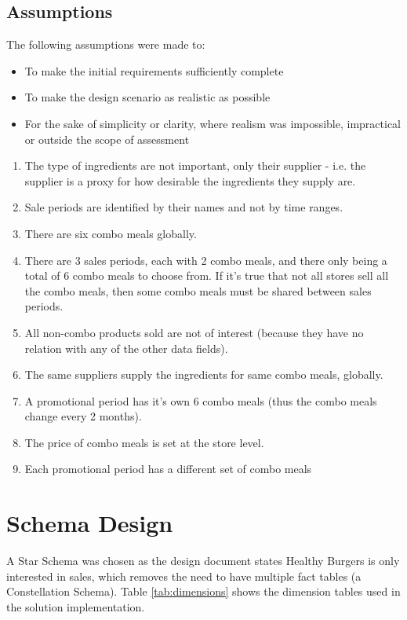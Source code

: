 \documentclass[12pt, a4paper]{article}
\begin{document}
\subsection*{Assumptions}

The following assumptions were made to:

\begin{itemize}
	\item To make the initial requirements \cite{designdoc} sufficiently complete
	\item To make the design scenario as realistic as possible 
	\item For the sake of simplicity or clarity, where realism was impossible, impractical or outside the scope of assessment
\end{itemize}

\begin{enumerate}
	\item The type of ingredients are not important, only their supplier - i.e. the supplier is a proxy for how desirable the ingredients they supply are. 
	\item Sale periods are identified by their names and not by time ranges.
	\item There are six combo meals globally.
	\item There are 3 sales periods, each with 2 combo meals, and there only being a total of 6 combo meals to choose from. If it’s true that not all stores sell all the combo meals, then some combo meals must be shared between sales periods.
	\item All non-combo products sold are not of interest (because they have no relation with any of the other data fields).
	\item The same suppliers supply the ingredients for same combo meals, globally.
	\item A promotional period has it’s own 6 combo meals (thus the combo meals change every 2 months).
	\item The price of combo meals is set at the store level.
	\item Each promotional period has a different set of combo meals
\end{enumerate}

\section*{Schema Design}

A Star Schema was chosen as the design document \cite{designdoc} states Healthy Burgers is only interested in sales, which removes the need to have multiple fact tables (a Constellation Schema). Table \ref{tab:dimensions} shows the dimension tables used in the solution implementation.
\end{document}
